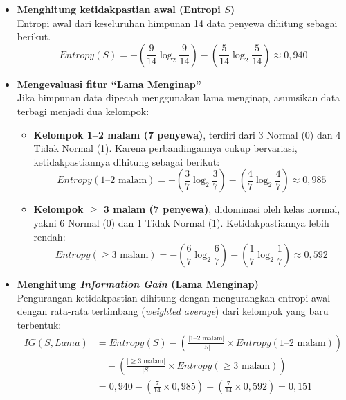 \begin{itemize}
    \item \textbf{Menghitung ketidakpastian awal (Entropi $S$)} \\
    Entropi awal dari keseluruhan himpunan 14 data penyewa dihitung sebagai berikut.
    $$
    Entropy(S) = - \left(\frac{9}{14} \log_2 \frac{9}{14}\right) - \left(\frac{5}{14} \log_2 \frac{5}{14}\right) \approx 0{,}940
    $$
    
    \item \textbf{Mengevaluasi fitur ``Lama Menginap''} \\
    Jika himpunan data dipecah menggunakan lama menginap, asumsikan data terbagi menjadi dua kelompok:
    \begin{itemize}
        \item \textbf{Kelompok 1--2 malam (7 penyewa)}, terdiri dari 3 Normal (0) dan 4 Tidak Normal (1). Karena perbandingannya cukup bervariasi, ketidakpastiannya dihitung sebagai berikut:
        $$
        Entropy(1\text{--}2\text{ malam}) = - \left(\frac{3}{7} \log_2 \frac{3}{7}\right) - \left(\frac{4}{7} \log_2 \frac{4}{7}\right) \approx 0{,}985
        $$
        \item \textbf{Kelompok $\geq$ 3 malam (7 penyewa)}, didominasi oleh kelas normal, yakni 6 Normal (0) dan 1 Tidak Normal (1). Ketidakpastiannya lebih rendah:
        $$
        Entropy(\geq3\text{ malam}) = - \left(\frac{6}{7} \log_2 \frac{6}{7}\right) - \left(\frac{1}{7} \log_2 \frac{1}{7}\right) \approx 0{,}592
        $$
    \end{itemize}
    
    \item \textbf{Menghitung \textit{Information Gain} (Lama Menginap)} \\
    Pengurangan ketidakpastian dihitung dengan mengurangkan entropi awal dengan rata-rata tertimbang (\textit{weighted average}) dari kelompok yang baru terbentuk:
    \begin{align*}
    IG(S, Lama) &= Entropy(S) - \left( \frac{|1\text{--}2\text{ malam}|}{|S|} \times Entropy(1\text{--}2\text{ malam}) \right) \\
    &\quad - \left( \frac{|\geq3\text{ malam}|}{|S|} \times Entropy(\geq3\text{ malam}) \right) \\
    &= 0{,}940 - \left( \frac{7}{14} \times 0{,}985 \right) - \left( \frac{7}{14} \times 0{,}592 \right) = 0{,}151
    \end{align*}
\end{itemize}

